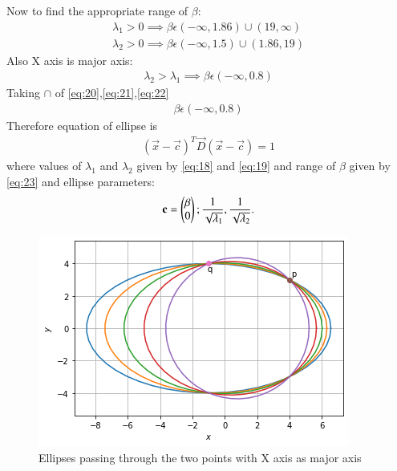 \documentclass[journal,12pt,twocolumn]{IEEEtran}
\begin{document}
Now to find the appropriate range of $\beta$:
\begin{align}
\lambda_1 >0
\implies \beta\epsilon(-\infty,1.86)\cup(19,\infty)\label{eq:20}\\
\lambda_2 >0
\implies \beta\epsilon(-\infty,1.5)\cup(1.86,19)\label{eq:21}
\end{align}
Also X axis is major axis:
\begin{align}
    \lambda_2>\lambda_1
    \implies\beta\epsilon(-\infty,0.8)\label{eq:22}
\end{align}
Taking $\cap$ of \eqref{eq:20},\eqref{eq:21},\eqref{eq:22}
\begin{align}
  \beta\epsilon(-\infty,0.8) \label{eq:23} 
\end{align}
Therefore equation of ellipse is
\begin{align}
(\vec{x}-\vec{c})^T\vec{D}(\vec{x}-\vec{c})=1
\end{align}
where values of $\lambda_1$ and $\lambda_2$ given by \eqref{eq:18} and \eqref{eq:19} and range of $\beta$ given by \eqref{eq:23} and ellipse parameters:
\begin{align}
\mathbf{c} = \begin{pmatrix}\beta\\0\end{pmatrix};
\frac{1}{\sqrt{\lambda_1}},
\frac{1}{\sqrt{\lambda_2}}.
\end{align}
\begin{figure}[!ht]
\centering
\includegraphics[width=\columnwidth]{figure5_1}
\caption{Ellipses passing through the two points with X axis as major axis}
\label{fig:ellipses}	
\end{figure}
\end{document}
